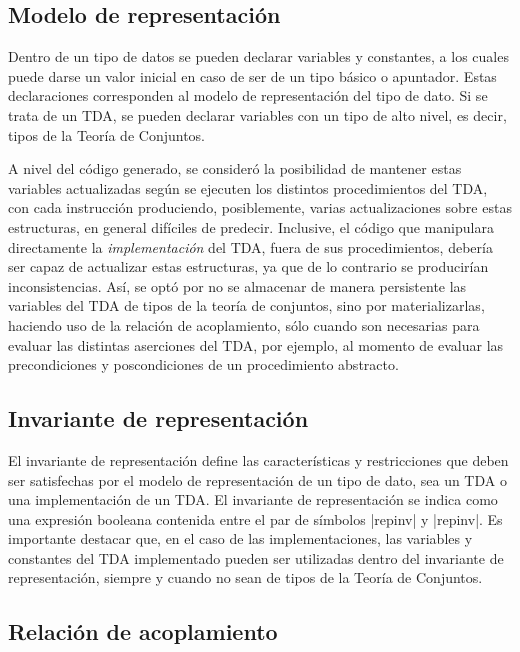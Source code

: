 {{\subsection{Modelo de representación}

Dentro de un tipo de datos se pueden declarar variables y constantes, a los
cuales puede darse un valor inicial en caso de ser de un tipo básico o
apuntador. Estas declaraciones corresponden al modelo de representación del tipo
de dato. Si se trata de un TDA, se pueden declarar variables con un tipo de alto
nivel, es decir, tipos de la Teoría de Conjuntos.

A nivel del código generado, se consideró la posibilidad de mantener estas
variables actualizadas según se ejecuten los distintos procedimientos del TDA,
con cada instrucción produciendo, posiblemente, varias actualizaciones sobre
estas estructuras, en general difíciles de predecir. Inclusive, el código que
manipulara directamente la \textit{implementación} del TDA, fuera de sus
procedimientos, debería ser capaz de actualizar estas estructuras, ya que de lo
contrario se producirían inconsistencias. Así, se optó por no se almacenar de
manera persistente las variables del TDA de tipos de la teoría de conjuntos,
sino por materializarlas, haciendo uso de la relación de acoplamiento, sólo
cuando son necesarias para evaluar las distintas aserciones del TDA, por
ejemplo, al momento de evaluar las precondiciones y poscondiciones de un
procedimiento abstracto.

\subsection{Invariante de representación}

El invariante de representación define las características y restricciones que
deben ser satisfechas por el modelo de representación de un tipo de dato, sea un
TDA o una implementación de un TDA. El invariante de representación se indica
como una expresión booleana contenida entre el par de símbolos \ingra|{repinv|
y \ingra|repinv}|. Es importante destacar que, en el caso de las
implementaciones, las variables y constantes del TDA implementado pueden ser
utilizadas dentro del invariante de representación, siempre y cuando no sean de
tipos de la Teoría de Conjuntos.

\subsection{Relación de acoplamiento}

}}
